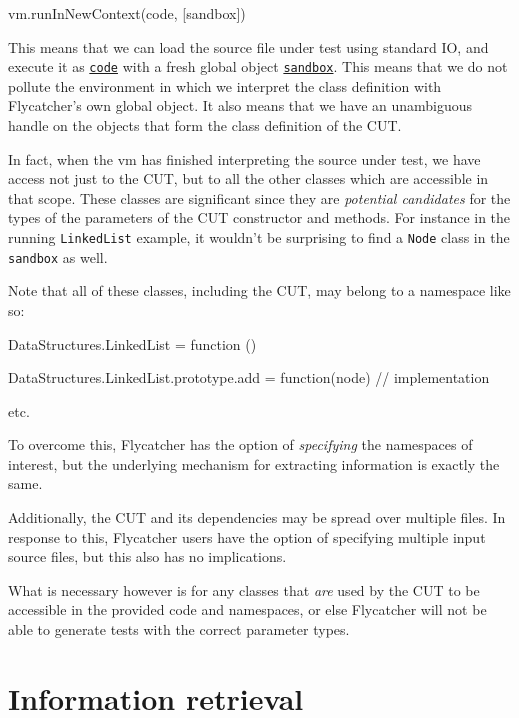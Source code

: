 \begin{code}
   vm.runInNewContext(code, [sandbox])
\end{code}

This means that we can load the source file under test using standard IO, and execute it as \texttt{\underline{code}} with a fresh global object \texttt{\underline{sandbox}}. This means that we do not pollute the environment in which we interpret the class definition with \textsf{Flycatcher}'s own global object. It also means that we have an unambiguous handle on the objects that form the class definition of the CUT.

In fact, when the vm has finished interpreting the source under test, we have access not just to the CUT, but to all the other classes which are accessible in that scope. These classes are significant since they are \emph{potential candidates} for the types of the parameters of the CUT constructor and methods. For instance in the running \texttt{LinkedList} example, it wouldn't be surprising to find a \texttt{Node} class in the \texttt{sandbox} as well.

Note that all of these classes, including the CUT, may belong to a namespace like so:

\begin{code}[caption=Namespaces,label=ns]
DataStructures.LinkedList = function () {
}

DataStructures.LinkedList.prototype.add = function(node) {
   // implementation
}

etc.
\end{code}

To overcome this, \textsf{Flycatcher} has the option of \emph{specifying} the namespaces of interest, but the underlying mechanism for extracting information is exactly the same.

Additionally, the CUT and its dependencies may be spread over multiple files. In response to this, \textsf{Flycatcher} users have the option of specifying multiple input source files, but this also has no implications.

What is necessary however is for any classes that \emph{are} used by the CUT to be accessible in the provided code and namespaces, or else \textsf{Flycatcher} will not be able to generate tests with the correct parameter types.

\section{Information retrieval}
